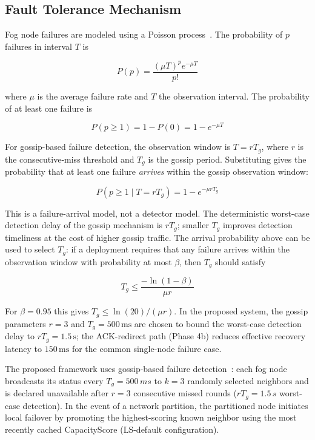 \documentclass[conference]{IEEEtran}
\begin{document}
    \subsection{Fault Tolerance Mechanism}
    Fog node failures are modeled using a Poisson process~\cite{abdelbasset2019fault}. The probability of $p$ failures in interval $T$ is

    \begin{equation}
    P(p) = \frac{(\mu T)^p e^{-\mu T}}{p!}
    \end{equation}

    where $\mu$ is the average failure rate and $T$ the observation interval. The probability of at least one failure is

    \begin{equation}
    P(p \geq 1) = 1 - P(0) = 1 - e^{-\mu T}
    \end{equation}

    For gossip-based failure detection, the observation window is $T = rT_g$, where $r$ is the consecutive-miss threshold and $T_g$ is the gossip period. Substituting gives the probability that at least one failure \emph{arrives} within the gossip observation window:

    \begin{equation}
    P(p \geq 1 \mid T = rT_g) = 1 - e^{-\mu r T_g}
    \end{equation}

    This is a failure-arrival model, not a detector model. The deterministic worst-case detection delay of the gossip mechanism is $rT_g$; smaller $T_g$ improves detection timeliness at the cost of higher gossip traffic. The arrival probability above can be used to select $T_g$: if a deployment requires that any failure arrives within the observation window with probability at most $\beta$, then $T_g$ should satisfy

    \begin{equation}
    T_g \leq \frac{-\ln(1-\beta)}{\mu r}
    \end{equation}

    For $\beta = 0.95$ this gives $T_g \leq \ln(20)/(\mu r)$. In the proposed system, the gossip parameters $r=3$ and $T_g=500\,\text{ms}$ are chosen to bound the worst-case detection delay to $rT_g = 1.5\,\text{s}$; the ACK-redirect path (Phase 4b) reduces effective recovery latency to $150\,\text{ms}$ for the common single-node failure case.

    The proposed framework uses gossip-based failure detection~\cite{demers1988epidemic}: each fog node broadcasts its status every $T_g=500\,ms$ to $k=3$ randomly selected neighbors and is declared unavailable after $r=3$ consecutive missed rounds ($rT_g=1.5\,s$ worst-case detection). In the event of a network partition, the partitioned node initiates local failover by promoting the highest-scoring known neighbor using the most recently cached CapacityScore (LS-default configuration).
\end{document}
